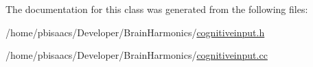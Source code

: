 The documentation for this class was generated from the following files\+:\begin{DoxyCompactItemize}
\item 
/home/pbisaacs/\+Developer/\+Brain\+Harmonics/\mbox{\hyperlink{cognitiveinput_8h}{cognitiveinput.\+h}}\item 
/home/pbisaacs/\+Developer/\+Brain\+Harmonics/\mbox{\hyperlink{cognitiveinput_8cc}{cognitiveinput.\+cc}}\end{DoxyCompactItemize}
